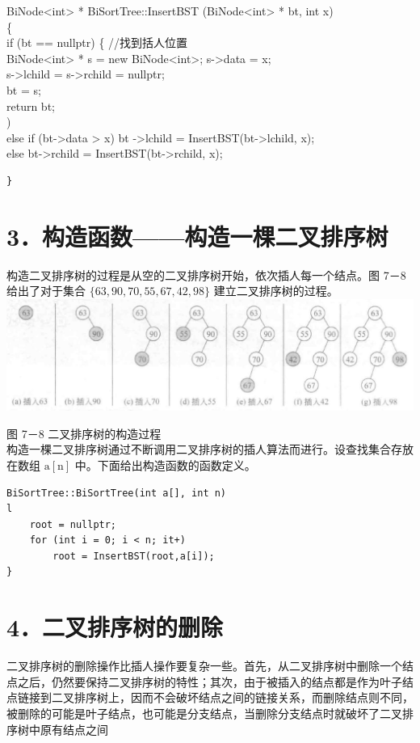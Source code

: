 \documentclass[10pt]{article}
\begin{document}
BiNode<int> * BiSortTree::InsertBST (BiNode<int> * bt, int x)\\
\{\\
if (bt == nullptr) \{ //找到括人位置\\
BiNode<int> * s = new BiNode<int>; s->data = x;\\
s->lchild = s->rchild = nullptr;\\
bt = s;\\
return bt;\\
)\\
else if (bt->data > x) bt ->lchild = InsertBST(bt->lchild, x);\\
else bt->rchild = InsertBST(bt->rchild, x);

\begin{verbatim}
}
\end{verbatim}

\section*{3．构造函数——构造一棵二叉排序树}
构造二叉排序树的过程是从空的二叉排序树开始，依次插人每一个结点。图 7－8 给出了对于集合 $\{63,90,70,55,67,42,98\}$ 建立二叉排序树的过程。\\
\includegraphics[max width=\textwidth, center]{2025_06_06_704745ea57b15b2333e5g-241}

图 7－8 二叉排序树的构造过程\\
构造一棵二叉排序树通过不断调用二叉排序树的插人算法而进行。设查找集合存放在数组 $\mathrm{a}[\mathrm{n}]$ 中。下面给出构造函数的函数定义。

\begin{verbatim}
BiSortTree::BiSortTree(int a[], int n)
l
    root = nullptr;
    for (int i = 0; i < n; it+)
        root = InsertBST(root,a[i]);
}
\end{verbatim}

\section*{4．二叉排序树的删除}
二叉排序树的删除操作比插人操作要复杂一些。首先，从二叉排序树中删除一个结点之后，仍然要保持二叉排序树的特性；其次，由于被插入的结点都是作为叶子结点链接到二叉排序树上，因而不会破坏结点之间的链接关系，而删除结点则不同，被删除的可能是叶子结点，也可能是分支结点，当删除分支结点时就破坏了二叉排序树中原有结点之间
\end{document}
